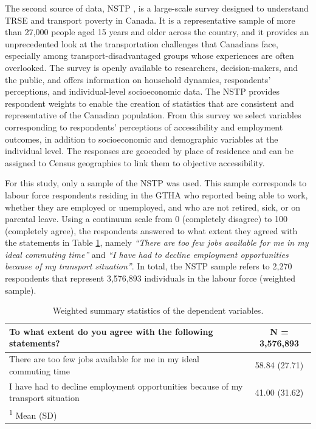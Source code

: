 \documentclass[preprint, 3p,
authoryear]{elsarticle} %
\begin{document}
The second source of data, NSTP \citep{tiznado-aitken}, is a large-scale
survey designed to understand TRSE and transport poverty in Canada. It
is a representative sample of more than 27,000 people aged 15 years and
older across the country, and it provides an unprecedented look at the
transportation challenges that Canadians face, especially among
transport-disadvantaged groups whose experiences are often overlooked.
The survey is openly available to researchers, decision-makers, and the
public, and offers information on household dynamics, respondents'
perceptions, and individual-level socioeconomic data. The NSTP provides
respondent weights to enable the creation of statistics that are
consistent and representative of the Canadian population. From this
survey we select variables corresponding to respondents' perceptions of
accessibility and employment outcomes, in addition to socioeconomic and
demographic variables at the individual level. The responses are
geocoded by place of residence and can be assigned to Census geographies
to link them to objective accessibility.

For this study, only a sample of the NSTP was used. This sample
corresponds to labour force respondents residing in the GTHA who
reported being able to work, whether they are employed or unemployed,
and who are not retired, sick, or on parental leave. Using a continuum
scale from 0 (completely disagree) to 100 (completely agree), the
respondents answered to what extent they agreed with the statements in
Table \ref{tab:out-description}, namely \emph{``There are too few jobs
available for me in my ideal commuting time''} and \emph{``I have had to
decline employment opportunities because of my transport situation''}.
In total, the NSTP sample refers to 2,270 respondents that represent
3,576,893 individuals in the labour force (weighted sample).

\begin{table}
\centering
\caption{\label{tab:unnamed-chunk-1}\label{tab:out-description}Weighted summary statistics of the dependent variables.}
\centering
\fontsize{10}{12}\selectfont
\begin{tabular}[t]{lc}
\toprule
To what extent do you agree with the following statements? & \textbf{N = 3,576,893}\\
\midrule
There are too few jobs available for me in my ideal commuting time & 58.84 (27.71)\\
I have had to decline employment opportunities because of my transport situation & 41.00 (31.62)\\
\bottomrule
\multicolumn{2}{l}{\rule{0pt}{1em}\textsuperscript{1} Mean (SD)}\\
\end{tabular}
\end{table}
\end{document}
